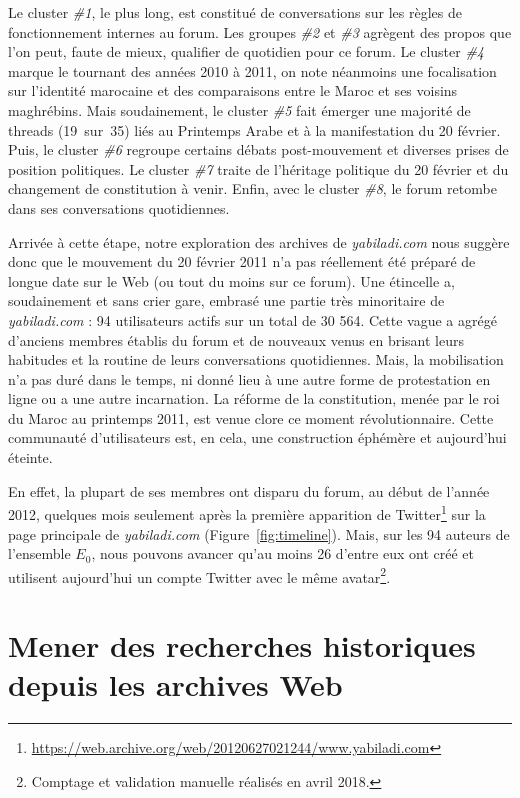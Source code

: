 \documentclass[symmetric,justified,marginals=raggedouter]{tufte-book}
\begin{document}
Le cluster \textit{\#1}, le plus long, est constitué de conversations sur les règles de fonctionnement internes au forum. Les groupes \textit{\#2} et \textit{\#3} agrègent des propos que l'on peut, faute de mieux, qualifier de quotidien pour ce forum. Le cluster \textit{\#4} marque le tournant des années 2010 à 2011, on note néanmoins une focalisation sur l'identité marocaine et des comparaisons entre le Maroc et ses voisins maghrébins. Mais soudainement, le cluster \textit{\#5} fait émerger une majorité de threads (19~sur~35) liés au Printemps Arabe et à la manifestation du 20 février. Puis, le cluster \textit{\#6} regroupe certains débats post-mouvement et diverses prises de position politiques. Le cluster \textit{\#7} traite de l'héritage politique du 20 février et du changement de constitution à venir. Enfin, avec le cluster \textit{\#8}, le forum retombe dans ses conversations quotidiennes. \\

\newpage

\noindent Arrivée à cette étape, notre exploration des archives de \textit{yabiladi.com} nous suggère donc que le mouvement du 20 février 2011 n'a pas réellement été préparé de longue date sur le Web (ou tout du moins sur ce forum). Une étincelle a, soudainement et sans crier gare, embrasé une partie très minoritaire de \textit{yabiladi.com} : 94 utilisateurs actifs sur un total de 30 564. Cette vague a agrégé d'anciens membres établis du forum et de nouveaux venus en brisant leurs habitudes et la routine de leurs conversations quotidiennes. Mais, la mobilisation n'a pas duré dans le temps, ni donné lieu à une autre forme de protestation en ligne ou a une autre incarnation. La réforme de la constitution, menée par le roi du Maroc au printemps 2011, est venue clore ce moment révolutionnaire. Cette communauté d'utilisateurs est, en cela, une construction éphémère et aujourd'hui éteinte. 

En effet, la plupart de ses membres ont disparu du forum, au début de l'année 2012, quelques mois seulement après la première apparition de Twitter\footnote{\RaggedOuter \url{https://web.archive.org/web/20120627021244/www.yabiladi.com}} sur la page principale de \textit{yabiladi.com} (Figure~\ref{fig:timeline}). Mais, sur les 94 auteurs de l'ensemble $E_0$, nous pouvons avancer qu'au moins 26 d'entre eux ont créé et utilisent aujourd'hui un compte Twitter avec le même avatar\footnote{\RaggedOuter Comptage et validation manuelle réalisés en avril 2018.}.

\section{Mener des recherches historiques depuis les archives Web}
\label{sec:6_moment}
\end{document}

